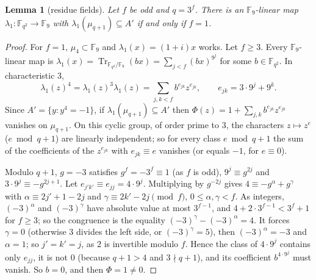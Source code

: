 \documentclass[11pt,a4paper]{amsart}
\newtheorem{lemma}{Lemma}
\theoremstyle{remark}
\newcommand{\F}{\mathbb{F}}
\newcommand{\Tr}{\operatorname{Tr}}
\begin{document}
\begin{lemma}[residue fields]\label{lem:B5}
Let $f$ be odd and $q=3^f$. There is an $\F_9$-linear map $\lambda_1:\F_{q^2}\to\F_9$ with
$\lambda_1(\mu_{q+1})\subseteq A'$ if and only if $f=1$.
\end{lemma}

\begin{proof}
For $f=1$, $\mu_4\subset\F_9$ and $\lambda_1(x)=(1+i)x$ works. Let $f\ge3$. Every $\F_9$-linear map is
$\lambda_1(x)=\Tr_{\F_{q^2}/\F_9}(bx)=\sum_{j<f}(bx)^{9^j}$ for some $b\in\F_{q^2}$. In characteristic $3$,
\[
\lambda_1(z)^4=\lambda_1(z)^3\lambda_1(z)=\sum_{j,k<f}b^{e_{jk}}z^{e_{jk}},\qquad e_{jk}=3\cdot9^j+9^k.
\]
Since $A'=\{y:y^4=-1\}$, if $\lambda_1(\mu_{q+1})\subseteq A'$ then $\Phi(z)=1+\sum_{j,k}b^{e_{jk}}z^{e_{jk}}$
vanishes on $\mu_{q+1}$. On this cyclic group, of order prime to $3$, the characters $z\mapsto z^e$
($e\bmod q+1$) are linearly independent; so for every class $e\bmod q+1$ the sum of the coefficients of the
$z^{e_{jk}}$ with $e_{jk}\equiv e$ vanishes (or equals $-1$, for $e\equiv0$).

Modulo $q+1$, $g=-3$ satisfies $g^f=-3^f\equiv1$ (as $f$ is odd), $9^j\equiv g^{2j}$ and $3\cdot9^j\equiv-g^{2j+1}$.
Let $e_{j'k'}\equiv e_{jj}=4\cdot9^j$. Multiplying by $g^{-2j}$ gives $4\equiv-g^\alpha+g^\gamma$ with
$\alpha\equiv2j'+1-2j$ and $\gamma\equiv2k'-2j\pmod f$, $0\le\alpha,\gamma<f$. As integers, $(-3)^\alpha$ and
$(-3)^\gamma$ have absolute value at most $3^{f-1}$, and $4+2\cdot3^{f-1}<3^f+1$ for $f\ge3$; so the congruence is
the equality $(-3)^\gamma-(-3)^\alpha=4$. It forces $\gamma=0$ (otherwise $3$ divides the left side, or
$(-3)^\gamma=5$), then $(-3)^\alpha=-3$ and $\alpha=1$; so $j'=k'=j$, as $2$ is invertible modulo $f$. Hence the
class of $4\cdot9^j$ contains only $e_{jj}$, it is not $0$ (because $q+1>4$ and $3\nmid q+1$), and its coefficient
$b^{4\cdot9^j}$ must vanish. So $b=0$, and then $\Phi=1\ne0$.
\end{proof}
\end{document}
